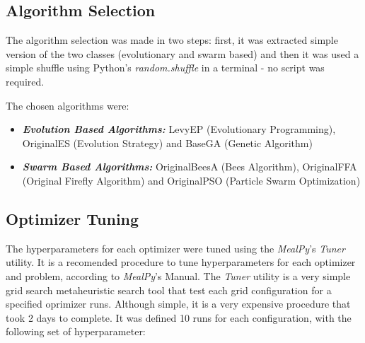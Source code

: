 \documentclass[conference]{IEEEtran}
\begin{document}
\subsection{Algorithm Selection}
\label{subsec:methodology-algorithm-selection}

The algorithm selection was made in two steps: first, it was extracted simple version of the two classes (evolutionary and swarm based) and
then it was used a simple shuffle using Python's \textit{random.shuffle} in a terminal - no script was required.

The chosen algorithms were:

\begin{itemize}
    \item \textit{\textbf{Evolution Based Algorithms: }} LevyEP (Evolutionary Programming),
    OriginalES (Evolution Strategy) and BaseGA (Genetic Algorithm)
    \item \textit{\textbf{Swarm Based Algorithms: }} OriginalBeesA (Bees Algorithm),
    OriginalFFA (Original Firefly Algorithm) and OriginalPSO (Particle Swarm Optimization)
\end{itemize}

\subsection{Optimizer Tuning}
\label{subsec:methodology-optimizer-tuning}

The hyperparameters for each optimizer were tuned using the \textit{MealPy}'s \textit{Tuner} utility.
It is a recomended procedure to tune hyperparameters for each optimizer and problem, according to
\textit{MealPy}'s Manual.
The \textit{Tuner} utility is a very simple grid search metaheuristic search tool
that test each grid configuration for a specified oprimizer runs.
Although simple, it is a very expensive procedure that took 2 days to complete. It was defined 10 runs for each
configuration, with the following set of hyperparameter:
\end{document}
